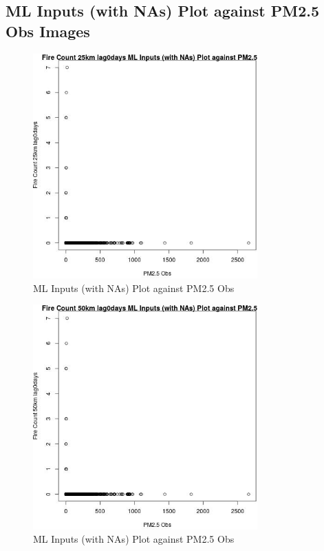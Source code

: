 
\subsection{ML Inputs (with NAs) Plot against PM2.5 Obs Images} 
 

\begin{figure} 
\centering  
\includegraphics[width=0.77\textwidth]{Code_Outputs/Report_ML_input_PM25_Step4_part_e_de_duplicated_aves_compiled_2019-05-21wNAs_Fire_Count_25km_lag0daysvPM25_Obs.jpg} 
\caption{\label{fig:Report_ML_input_PM25_Step4_part_e_de_duplicated_aves_compiled_2019-05-21wNAsFire_Count_25km_lag0daysvPM25_Obs}ML Inputs (with NAs) Plot against PM2.5 Obs} 
\end{figure} 
 

\begin{figure} 
\centering  
\includegraphics[width=0.77\textwidth]{Code_Outputs/Report_ML_input_PM25_Step4_part_e_de_duplicated_aves_compiled_2019-05-21wNAs_Fire_Count_50km_lag0daysvPM25_Obs.jpg} 
\caption{\label{fig:Report_ML_input_PM25_Step4_part_e_de_duplicated_aves_compiled_2019-05-21wNAsFire_Count_50km_lag0daysvPM25_Obs}ML Inputs (with NAs) Plot against PM2.5 Obs} 
\end{figure} 
 

